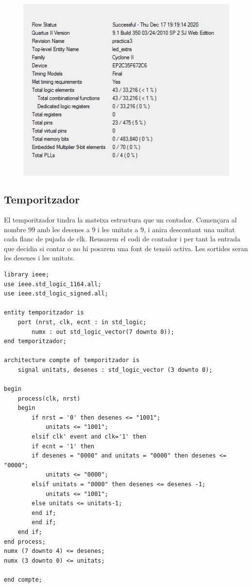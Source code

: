 \documentclass[12pt, a4papre]{article}
\begin{document}
	
			\begin{figure}[H]
			
				\begin{center}
		\includegraphics[width=130mm]{informeLeds.jpeg}
		\end{center}
	\end{figure}
	
\subsection{Temporitzador}

El temporitzador tindra la mateixa estructura que un contador. Començara al nombre 99 amb les desenes a 9 i les unitats a 9, i anira descontant una unitat cada flanc de pujada de clk. Reusarem el codi de contador i per tant la entrada que decidia si contar o no hi posarem una font de tensió activa. Les sortides seran les desenes i les unitats.


\begin{lstlisting}[style=vhdl, frame=single, basicstyle=\tiny]
	library ieee;
use ieee.std_logic_1164.all;
use ieee.std_logic_signed.all;

entity temporitzador is
	port (nrst, clk, ecnt : in std_logic;
		numx : out std_logic_vector(7 downto 0));
end temporitzador;

architecture compte of temporitzador is 
	signal unitats, desenes : std_logic_vector (3 downto 0);
	
begin 
	process(clk, nrst)
	begin
	    if nrst = '0' then desenes <= "1001";
			unitats <= "1001";
	    elsif clk' event and clk='1' then
		if ecnt = '1' then
		if desenes = "0000" and unitats = "0000" then desenes <= "0000";
			unitats <= "0000";
		elsif unitats = "0000" then desenes <= desenes -1;
			unitats <= "1001";
		else unitats <= unitats-1;
		end if;
	    end if;
	end if;
end process;
numx (7 downto 4) <= desenes;
numx (3 downto 0) <= unitats;

end compte;
	\end{lstlisting}
	
\end{document}
